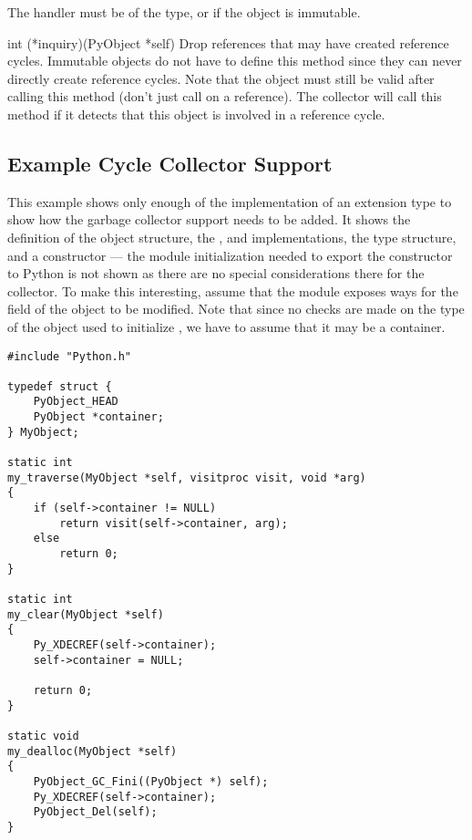 \documentclass{manual}
\begin{document}
The  handler must be of the  type, or
\NULL{} if the object is immutable.

\begin{ctypedesc}[inquiry]{int (*inquiry)(PyObject *self)}
  Drop references that may have created reference cycles.  Immutable
  objects do not have to define this method since they can never
  directly create reference cycles.  Note that the object must still
  be valid after calling this method (don't just call
   on a reference).  The collector will call
  this method if it detects that this object is involved in a
  reference cycle.
\end{ctypedesc}


\subsection{Example Cycle Collector Support
            \label{example-cycle-support}}

This example shows only enough of the implementation of an extension
type to show how the garbage collector support needs to be added.  It
shows the definition of the object structure, the
,  and 
implementations, the type structure, and a constructor --- the module
initialization needed to export the constructor to Python is not shown
as there are no special considerations there for the collector.  To
make this interesting, assume that the module exposes ways for the
 field of the object to be modified.  Note that
since no checks are made on the type of the object used to initialize
, we have to assume that it may be a container.

\begin{verbatim}
#include "Python.h"

typedef struct {
    PyObject_HEAD
    PyObject *container;
} MyObject;

static int
my_traverse(MyObject *self, visitproc visit, void *arg)
{
    if (self->container != NULL)
        return visit(self->container, arg);
    else
        return 0;
}

static int
my_clear(MyObject *self)
{
    Py_XDECREF(self->container);
    self->container = NULL;

    return 0;
}

static void
my_dealloc(MyObject *self)
{
    PyObject_GC_Fini((PyObject *) self);
    Py_XDECREF(self->container);
    PyObject_Del(self);
}
\end{verbatim}
\end{document}
